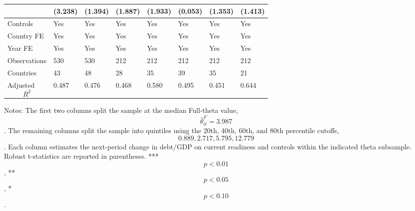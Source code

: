 \begin{table}[H]
\begin{threeparttable}
\begin{tabularx}{\textwidth}{lYYYYYYY}
  & (3.238) & (1.394) & (1.887) & (1.933) & (0.053) & (1.353) & (1.413) \\
\midrule
Controls & Yes & Yes & Yes & Yes & Yes & Yes & Yes \\
Country FE & Yes & Yes & Yes & Yes & Yes & Yes & Yes \\
Year FE & Yes & Yes & Yes & Yes & Yes & Yes & Yes \\
Observations & 530 & 530 & 212 & 212 & 212 & 212 & 212 \\
Countries & 43 & 48 & 28 & 35 & 39 & 35 & 21 \\
Adjusted $$R^2$$ & 0.487 & 0.476 & 0.468 & 0.580 & 0.495 & 0.451 & 0.644 \\
\bottomrule
\end{tabularx}
\begin{tablenotes}[flushleft]\footnotesize
\item Notes: The first two columns split the sample at the median Full-theta value, $$\widehat{\theta}^{F}_{it}=3.987$$. The remaining columns split the sample into quintiles using the 20th, 40th, 60th, and 80th percentile cutoffs, $$0.889, 2.717, 5.795, 12.779$$. Each column estimates the next-period change in debt/GDP on current readiness and controls within the indicated theta subsample. Robust t-statistics are reported in parentheses. *** $$p<0.01$$, ** $$p<0.05$$, * $$p<0.10$$.
\end{tablenotes}
\end{threeparttable}
\end{table}
